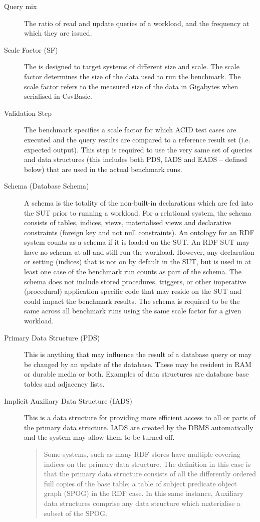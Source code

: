 \begin{description}
    \item[Query mix] The ratio of read and update queries of a workload, and the frequency at which they are issued.
    
    \item[Scale Factor (SF)] The \ldbcsnb is designed to target systems of different size and scale. The scale factor determines the size of the data used to run the benchmark. The scale factor refers to the measured size of the data in Gigabytes when serialised in CsvBasic.

    \item[Validation Step] The benchmark specifies a scale factor for which ACID test cases are executed and the query results are compared to a reference result set (i.e. expected output). This step is required to use the very same set of queries and data structures (this includes both PDS, IADS and EADS -- defined below) that are used in the actual benchmark runs. 
    
    \item[Schema (Database Schema)] A schema is the totality of the non-built-in declarations which are fed into the SUT prior to running a workload. For a relational system, the schema consists of tables, indices, views, materialised views and declarative constraints (\eg foreign key and not null constraints). An ontology for an RDF system counts as a schema if it is loaded on the SUT. An RDF SUT may have no schema at all and still run the workload. However, any declaration or setting (\eg indices) that is not on by default in the SUT, but is used in at least one case of the benchmark run counts as part of the schema.
    The schema does not include stored procedures, triggers, or other imperative (procedural) application specific code that may reside on the SUT and could impact the benchmark results. The schema is required to be the same across all benchmark runs using the same scale factor for a given workload.

    \item[Primary Data Structure (PDS)] 
    This is anything that may influence the result of a database query or may be changed by an update of the database. These may be resident in RAM or durable media or both. Examples of data structures are database base tables and adjacency lists.

    \item[Implicit Auxiliary Data Structure (IADS)] This is a data structure for providing more efficient access to all or parts of the primary data structure. IADS are created by the DBMS automatically and the system may allow them to be turned off. 
    \begin{quote}
        Some systems, such as many RDF stores have multiple covering indices on the primary data structure. The definition in this case is that the primary data structure consists of all the differently ordered full copies of the base table; a table of subject predicate object graph (SPOG) in the RDF case. In this same instance, Auxiliary data structures comprise any data structure which materialise a subset of the SPOG.    
    \end{quote}
    

\end{description}
